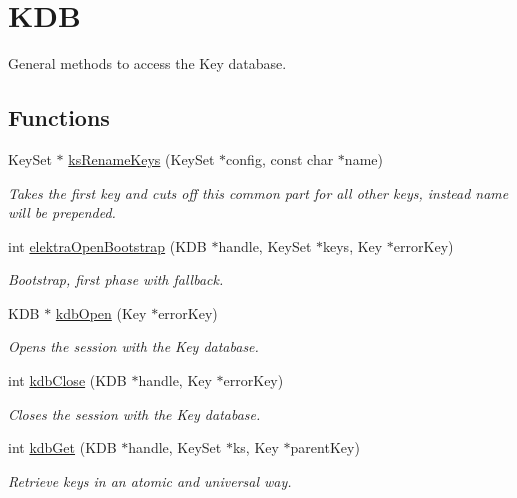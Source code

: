 \hypertarget{group__kdb}{}\section{K\+DB}
\label{group__kdb}


General methods to access the Key database.  


\subsection*{Functions}
\begin{DoxyCompactItemize}
\item 
Key\+Set $\ast$ \mbox{\hyperlink{group__kdb_ga1ba80a565f54490f362df95f401bcb29}{ks\+Rename\+Keys}} (Key\+Set $\ast$config, const char $\ast$name)
\begin{DoxyCompactList}\small\item\em Takes the first key and cuts off this common part for all other keys, instead name will be prepended. \end{DoxyCompactList}\item 
\mbox{\label{group__kdb_ga5bfaad0230457cd6386032fe65c41576}} 
int \mbox{\hyperlink{group__kdb_ga5bfaad0230457cd6386032fe65c41576}{elektra\+Open\+Bootstrap}} (K\+DB $\ast$handle, Key\+Set $\ast$keys, Key $\ast$error\+Key)
\begin{DoxyCompactList}\small\item\em Bootstrap, first phase with fallback. \end{DoxyCompactList}\item 
K\+DB $\ast$ \mbox{\hyperlink{group__kdb_ga6808defe5870f328dd17910aacbdc6ca}{kdb\+Open}} (Key $\ast$error\+Key)
\begin{DoxyCompactList}\small\item\em Opens the session with the Key database. \end{DoxyCompactList}\item 
int \mbox{\hyperlink{group__kdb_gadb54dc9fda17ee07deb9444df745c96f}{kdb\+Close}} (K\+DB $\ast$handle, Key $\ast$error\+Key)
\begin{DoxyCompactList}\small\item\em Closes the session with the Key database. \end{DoxyCompactList}\item 
int \mbox{\hyperlink{group__kdb_ga28e385fd9cb7ccfe0b2f1ed2f62453a1}{kdb\+Get}} (K\+DB $\ast$handle, Key\+Set $\ast$ks, Key $\ast$parent\+Key)
\begin{DoxyCompactList}\small\item\em Retrieve keys in an atomic and universal way. \end{DoxyCompactList}\item 

\end{DoxyCompactItemize}
